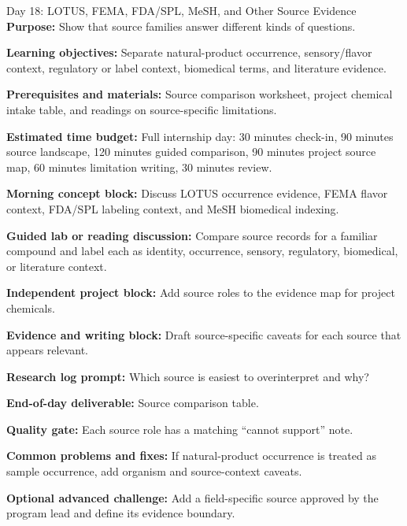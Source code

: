 \begin{dailybox}{Day 18: LOTUS, FEMA, FDA/SPL, MeSH, and Other Source Evidence}
\textbf{Purpose:} Show that source families answer different kinds of questions.

\textbf{Learning objectives:} Separate natural-product occurrence, sensory/flavor context, regulatory or label context, biomedical terms, and literature evidence.

\textbf{Prerequisites and materials:} Source comparison worksheet, project chemical intake table, and readings on source-specific limitations.

\textbf{Estimated time budget:} Full internship day: 30 minutes check-in, 90 minutes source landscape, 120 minutes guided comparison, 90 minutes project source map, 60 minutes limitation writing, 30 minutes review.

\textbf{Morning concept block:} Discuss LOTUS occurrence evidence, FEMA flavor context, FDA/SPL labeling context, and MeSH biomedical indexing.

\textbf{Guided lab or reading discussion:} Compare source records for a familiar compound and label each as identity, occurrence, sensory, regulatory, biomedical, or literature context.

\textbf{Independent project block:} Add source roles to the evidence map for project chemicals.

\textbf{Evidence and writing block:} Draft source-specific caveats for each source that appears relevant.

\textbf{Research log prompt:} Which source is easiest to overinterpret and why?

\textbf{End-of-day deliverable:} Source comparison table.

\textbf{Quality gate:} Each source role has a matching ``cannot support'' note.

\textbf{Common problems and fixes:} If natural-product occurrence is treated as sample occurrence, add organism and source-context caveats.

\textbf{Optional advanced challenge:} Add a field-specific source approved by the program lead and define its evidence boundary.
\end{dailybox}

